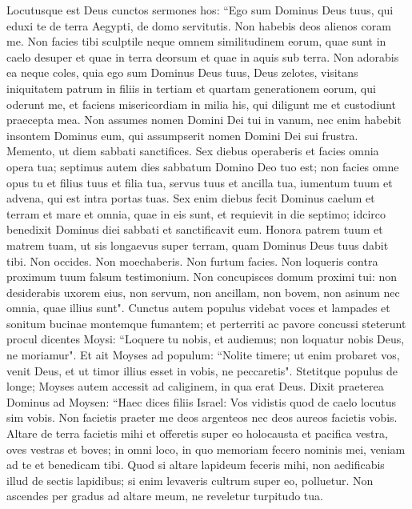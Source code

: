 \begin{biblechapter}  
\verse Locutusque est Deus cunctos sermones hos: 
\verse “Ego sum Dominus Deus tuus, qui eduxi te de terra Aegypti, de domo servitutis. 
\verse Non habebis deos alienos coram me. 
\verse Non facies tibi sculptile neque omnem similitudinem eorum, quae sunt in caelo desuper et quae in terra deorsum et quae in aquis sub terra. 
\verse Non adorabis ea neque coles, quia ego sum Dominus Deus tuus, Deus zelotes, visitans iniquitatem patrum in filiis in tertiam et quartam generationem eorum, qui oderunt me, 
\verse et faciens misericordiam in milia his, qui diligunt me et custodiunt praecepta mea. 
\verse Non assumes nomen Domini Dei tui in vanum, nec enim habebit insontem Dominus eum, qui assumpserit nomen Domini Dei sui frustra. 
\verse Memento, ut diem sabbati sanctifices. 
\verse Sex diebus operaberis et facies omnia opera tua; 
\verse septimus autem dies sabbatum Domino Deo tuo est; non facies omne opus tu et filius tuus et filia tua, servus tuus et ancilla tua, iumentum tuum et advena, qui est intra portas tuas. 
\verse Sex enim diebus fecit Dominus caelum et terram et mare et omnia, quae in eis sunt, et requievit in die septimo; idcirco benedixit Dominus diei sabbati et sanctificavit eum. 
\verse Honora patrem tuum et matrem tuam, ut sis longaevus super terram, quam Dominus Deus tuus dabit tibi. 
\verse Non occides. 
\verse Non moechaberis. 
\verse Non furtum facies. 
\verse Non loqueris contra proximum tuum falsum testimonium. 
\verse Non concupisces domum proximi tui: non desiderabis uxorem eius, non servum, non ancillam, non bovem, non asinum nec omnia, quae illius sunt". 
\verse Cunctus autem populus videbat voces et lampades et sonitum bucinae montemque fumantem; et perterriti ac pavore concussi steterunt procul 
\verse dicentes Moysi: “Loquere tu nobis, et audiemus; non loquatur nobis Deus, ne moriamur".  
\verse Et ait Moyses ad populum: “Nolite timere; ut enim probaret vos, venit Deus, et ut timor illius esset in vobis, ne peccaretis". 
\verse Stetitque populus de longe; Moyses autem accessit ad caliginem, in qua erat Deus. 
\verse Dixit praeterea Dominus ad Moysen: “Haec dices filiis Israel: Vos vidistis quod de caelo locutus sim vobis. 
\verse Non facietis praeter me deos argenteos nec deos aureos facietis vobis. 
\verse Altare de terra facietis mihi et offeretis super eo holocausta et pacifica vestra, oves vestras et boves; in omni loco, in quo memoriam fecero nominis mei, veniam ad te et benedicam tibi. 
\verse Quod si altare lapideum feceris mihi, non aedificabis illud de sectis lapidibus; si enim levaveris cultrum super eo, polluetur. 
\verse Non ascendes per gradus ad altare meum, ne reveletur turpitudo tua. 
\end{biblechapter}

